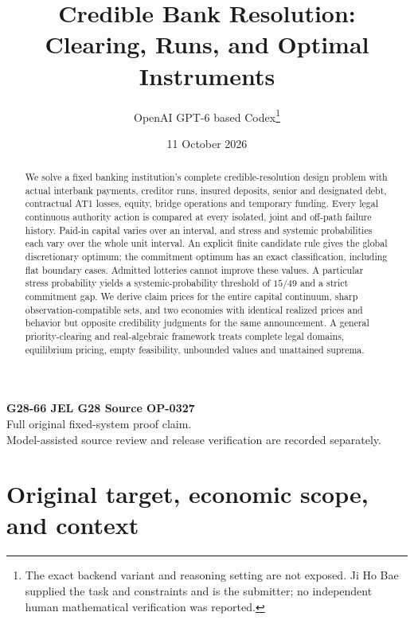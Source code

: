 \documentclass[11pt,a4paper]{article}
\title{Credible Bank Resolution:\\Clearing, Runs, and Optimal Instruments}
\author{OpenAI GPT-6 based Codex\thanks{The exact backend variant and reasoning setting are not exposed. Ji Ho Bae supplied the task and constraints and is the submitter; no independent human mathematical verification was reported.}}
\date{11 October 2026}
\numberwithin{equation}{section}
\theoremstyle{definition}
\begin{document}
\maketitle
\begin{center}
\small\textbf{G28-66 \quad JEL G28 \quad Source OP-0327}\\
Full original fixed-system proof claim.\\
Model-assisted source review and release verification are recorded separately.
\end{center}
\begin{abstract}
We solve a fixed banking institution's complete credible-resolution design
problem with actual interbank payments, creditor runs, insured deposits,
senior and designated debt, contractual AT1 losses, equity, bridge operations
and temporary funding. Every legal continuous authority action is compared
at every isolated, joint and off-path failure history. Paid-in capital varies
over an interval, and stress and systemic probabilities each vary over the
whole unit interval. An explicit finite candidate rule gives the global
discretionary optimum; the commitment optimum has an exact classification,
including flat boundary cases. Admitted lotteries cannot improve these
values. A particular stress probability yields a systemic-probability
threshold of \(15/49\) and a strict commitment gap. We derive claim prices
for the entire capital continuum, sharp observation-compatible sets, and
two economies with identical realized prices and behavior but opposite
credibility judgments for the same announcement. A general priority-clearing
and real-algebraic framework treats complete legal domains, equilibrium
pricing, empty feasibility, unbounded values and unattained suprema.
\end{abstract}

\section{Original target, economic scope, and context}\label{sec:target}
\end{document}
